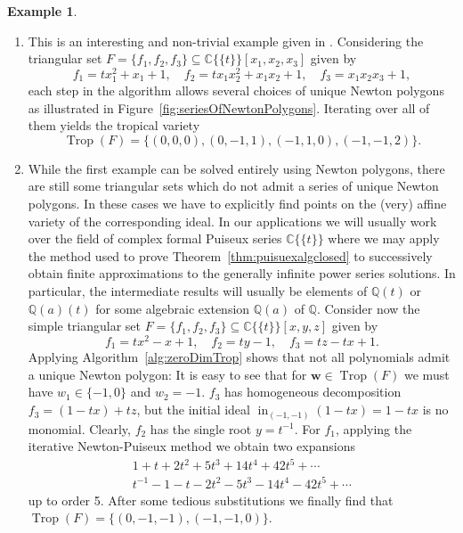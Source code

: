 \documentclass[
  paper=a4,
  titlepage,
  bibliography=totoc,
  pagesize=pdftex
]{scrartcl}
\numberwithin{figure}{section}
\numberwithin{equation}{section}
\numberwithin{table}{section}
\newcommand*\setC{\mathds{C}}
\newcommand*\setQ{\mathds{Q}}
\newcommand*\puiseux[2]{#1\{\!\{#2\}\!\}}
\newcommand*\CCt{\puiseux{\setC}{t}}
\let\vec\mathbf
\DeclareMathOperator{\Trop}{Trop}
\DeclareMathOperator{\initial}{in}
\theoremstyle{definition}
\newtheorem{example}[definition]{Example}
\numberwithin{definition}{section}
\begin{document}
\begin{example} \label{ex:zeroDimTrop}\
  \begin{enumerate}
    \item This is an interesting and  non-trivial example given in
      \cite[Example~2.13]{tropPointsLinks}. Considering the triangular set $F = \{ f_1,
      f_2, f_3 \} \subseteq \CCt[x_1, x_2, x_3]$ given by
      \[
        f_1 = tx_1^2 + x_1 + 1, \quad
        f_2 = tx_1x_2^2 + x_1x_2 + 1, \quad
        f_3 = x_1x_2x_3+1,
      \]
      each step in the algorithm allows several choices of unique Newton polygons as
      illustrated in Figure~\ref{fig:seriesOfNewtonPolygons}. Iterating over all of them
      yields the tropical variety
      \[
        \Trop(F) = \{ (0,0,0), (0,-1,1), (-1,1,0),(-1,-1,2) \}.
      \]
    \item While the first example can be solved entirely using Newton polygons, there are
      still some triangular sets which do not admit a series of unique Newton polygons. In
      these cases we have to explicitly find points on the (very) affine variety of the
      corresponding ideal. In our applications we will usually work over the field of
      complex formal Puiseux series $\CCt$ where we may apply the method used to prove
      Theorem~\ref{thm:puisuexalgclosed} to successively obtain finite approximations to
      the generally infinite power series solutions. In particular, the intermediate
      results will usually be elements of $\setQ(t)$ or $\setQ(a)(t)$ for some algebraic
      extension $\setQ(a)$ of $\setQ$. Consider now the simple triangular set $F = \{ f_1,
      f_2, f_3 \} \subseteq \CCt[x,y,z]$ given by
      \[
        f_1 = tx^2 - x + 1, \quad
        f_2 = ty - 1, \quad
        f_3 = tz - tx + 1.
      \]
      Applying Algorithm~\ref{alg:zeroDimTrop} shows that not all polynomials admit a
      unique Newton polygon: It is easy to see that for $\vec w \in \Trop(F)$ we must have
      $w_1 \in \{ -1, 0 \}$ and $w_2 = -1$. $f_3$ has homogeneous decomposition $f_3 = (1
      - tx) + tz$, but the initial ideal $\initial_{(-1,-1)}(1-tx) = 1-tx$ is no monomial.
      Clearly, $f_2$ has the single root $y = t^{-1}$. For $f_1$, applying the iterative
      Newton-Puiseux method we obtain two expansions
      \begin{align*}
        1 + t + 2t^2 + 5t^3 + 14t^4 + 42 t^5 + \cdots \\
        t^{-1} - 1 - t - 2t^2 - 5t^3 - 14t^4 - 42t^5 + \cdots
      \end{align*}
      up to order 5. After some tedious substitutions we finally find that $\Trop(F) = \{
      (0,-1,-1), (-1,-1,0) \}$.
      \label{ex:zdt2}
  \end{enumerate}
\end{example}
\end{document}
